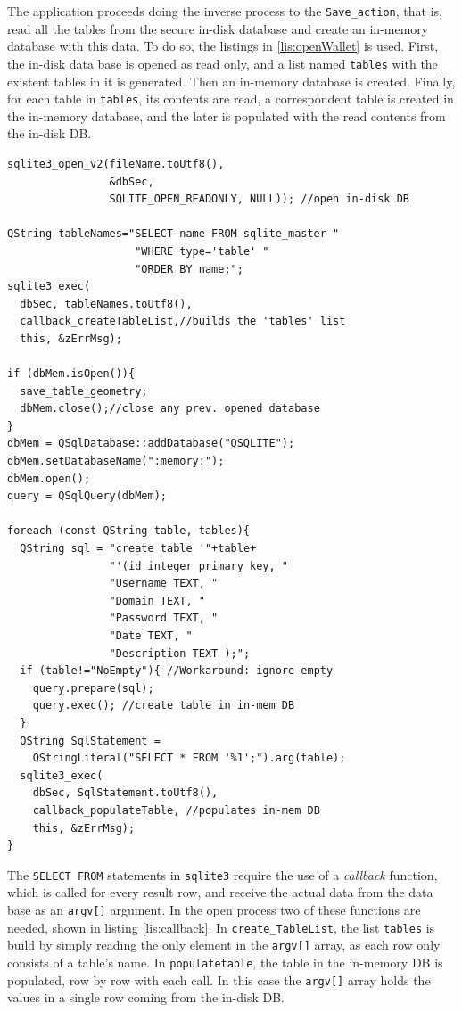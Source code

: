 The application proceeds doing the inverse process to the \texttt{Save\_action}, that is, read all the tables from the secure in-disk database and create an in-memory database with this data. To do so, the listings in \ref{lis:openWallet} is used. First, the in-disk data base is opened as read only, and a list named \texttt{tables} with the existent tables in it is generated. Then an in-memory database is created. Finally, for each table in \texttt{tables}, its contents are read, a correspondent table is created in the in-memory database, and the later is populated with the read contents from the in-disk DB.
\begin{lstlisting}[style=customc, float=htb, caption={Simplified Open Wallet action}, label = {lis:openWallet}]
sqlite3_open_v2(fileName.toUtf8(),
                &dbSec, 
                SQLITE_OPEN_READONLY, NULL)); //open in-disk DB

QString tableNames="SELECT name FROM sqlite_master "
                    "WHERE type='table' "
                    "ORDER BY name;";
sqlite3_exec(
  dbSec, tableNames.toUtf8(), 
  callback_createTableList,//builds the 'tables' list 
  this, &zErrMsg);

if (dbMem.isOpen()){ 
  save_table_geometry;
  dbMem.close();//close any prev. opened database
}
dbMem = QSqlDatabase::addDatabase("QSQLITE");
dbMem.setDatabaseName(":memory:");
dbMem.open();
query = QSqlQuery(dbMem);

foreach (const QString table, tables){
  QString sql = "create table '"+table+
                "'(id integer primary key, "
                "Username TEXT, "
                "Domain TEXT, "
                "Password TEXT, "
                "Date TEXT, "
                "Description TEXT );";
  if (table!="NoEmpty"){ //Workaround: ignore empty
    query.prepare(sql);
    query.exec(); //create table in in-mem DB
  }
  QString SqlStatement = 
    QStringLiteral("SELECT * FROM '%1';").arg(table);
  sqlite3_exec(
    dbSec, SqlStatement.toUtf8(), 
    callback_populateTable, //populates in-mem DB
    this, &zErrMsg);
}
\end{lstlisting}


The \texttt{SELECT FROM} statements in \texttt{sqlite3} require the use of a \textsl{callback} function, which is called for every result row, and receive the actual data from the data base as an \texttt{argv[]} argument. In the open process two of these functions are needed, shown in listing \ref{lis:callback}. 
In \texttt{create\_TableList}, the list \texttt{tables} is build by simply reading the only element in the \texttt{argv[]} array, as each row only consists of a table's name. 
In \texttt{populatetable}, the table in the in-memory DB is populated, row by row with each call.  In this case the \texttt{argv[]} array holds the values in a single row coming from the in-disk DB.

